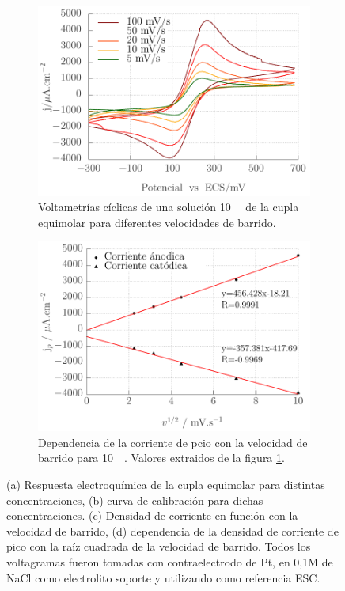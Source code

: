 {\begin{figure}[ht]
 	     	\begin{subfigure}[t]{0.495\textwidth}
         		\includegraphics[width=\textwidth]{Graficos/Velocidades_Fe.pdf}
        	    \caption{Voltametrías cíclicas de una solución \SI{10}{\milli\Molar} de la cupla equimolar \fe\space para diferentes velocidades de barrido.}
        	    \label{fig:Fe_c}
     		 	\end{subfigure}
     	 	\begin{subfigure}[t]{0.495\textwidth}
        		\includegraphics[width=\textwidth]{Graficos/VelocidadesCal_Fe.pdf}
       			\caption[Respuesta a diferentes velocidades de barrido para \fe]{Dependencia de la corriente de pcio con la velocidad de barrido para \fe\space \SI{10}{\milli\Molar}. Valores extraidos de la figura \ref{fig:Fe_c}.}
         		\label{fig:Fe_d}
     			\end{subfigure}
     		 \caption[Respuesta electroquímica para \fe]{(a) Respuesta electroquímica de la cupla equimolar \fe\space para distintas concentraciones, (b) curva de calibración para dichas concentraciones. (c) Densidad de corriente en función con la velocidad de barrido, (d) dependencia de la densidad de corriente de pico con la raíz cuadrada de la velocidad de barrido. Todos los voltagramas fueron tomadas con contraelectrodo de Pt, en 0,1M de NaCl como electrolito soporte y utilizando como referencia ESC.}
     		 \label{fig:ferro-ferri-CV}
     		 \end{figure}

}

